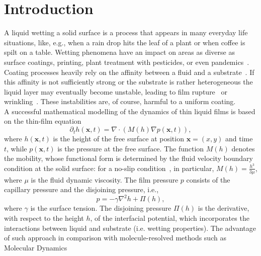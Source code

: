 \section{Introduction}\label{sec:intro}
A liquid wetting a solid surface is a process that appears in many everyday life situations, like, e.g., when a rain drop hits the leaf of a plant or when coffee is spilt on a table.
Wetting phenomena have an impact on areas as diverse as surface coatings, printing, plant treatment with pesticides, or even pandemics~\cite{RevModPhys.69.931, doi:10.1146/annurev-fluid-011212-140734, cassie1944wettability, Lenormand_1990,DERYCK1998278, doi:10.1146/annurev.fluid.31.1.347,BergeronNature,BhardwajPoF2020}.
Coating processes heavily rely on the affinity between a fluid and a substrate~\cite{RevModPhys.81.739}.
If this affinity is not sufficiently strong or the substrate is rather heterogeneous the liquid layer may eventually become unstable,
leading to film rupture~\cite{RevModPhys.69.931, RevModPhys.81.1131} or wrinkling~\cite{DASILVASOBRINHO19991204}. 
These instabilities are, of course, harmful to a uniform coating.\\ 
A successful mathematical modelling of the dynamics of thin liquid films is based on the thin-film equation~\cite{Reynolds, RevModPhys.69.931}
\begin{equation}\label{eq:thin_film}
    \partial_t h(\mathbf{x},t) = \nabla\cdot\left(M(h)\nabla p(\mathbf{x},t)\right),
\end{equation}
where $h(\mathbf{x},t)$ is the height of the free surface at position $\mathbf{x} = (x,y)$ and time $t$, while $p(\mathbf{x},t)$ is the pressure at the free surface.
The function $M(h)$ denotes the mobility, whose
functional form is determined by the fluid velocity boundary condition at 
the solid surface: for a no-slip condition~\cite{RevModPhys.69.931}, in particular, $M(h)=\frac{h^3}{3\mu}$, where $\mu$ is the fluid dynamic viscosity.
The film pressure $p$ consists of the capillary pressure and the disjoining pressure, i.e.,
\begin{equation}\label{eq:pressure}
    p = - \gamma\nabla^2 h + \Pi(h),
\end{equation}
where $\gamma$ is the surface tension. The disjoining pressure
$\Pi(h)$ is the derivative, with respect to the height $h$, of the interfacial potential,
which incorporates the interactions between liquid and substrate (i.e. wetting properties).
The advantage of such approach in comparison with molecule-resolved methods such as Molecular Dynamics~\cite{haile1992molecular, PhysRevE.100.023108, doi:10.1063/1.1290698, grabow1988thin}
